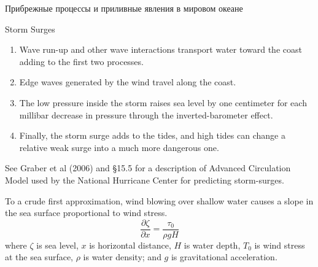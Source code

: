 \begin{chapter}{Прибрежные процессы и приливные явления в мировом океане}
\begin{section}{Storm Surges}
\begin{enumerate}
\item
Wave run-up and other wave interactions transport water toward the coast adding to the first two
processes.
%

\item
Edge waves generated by the wind travel along the coast.
%

\item
The low pressure inside the storm raises sea level by one centimeter
for each millibar decrease in pressure through the inverted-barometer
effect.
%

\item 
Finally, the storm surge adds to the tides, and high tides can change
a relative weak surge into a much more dangerous one.
%
\end{enumerate}
See Graber et al (2006) and \S 15.5 for a description of Advanced
Circulation Model used by the National Hurricane Center for predicting
storm-surges.
%

To a crude first approximation, wind blowing over shallow water causes
a slope in the sea surface proportional to wind stress.
\begin{equation}
\frac{\partial \zeta }{\partial x}= \frac{\tau _{0}}{\rho g H}
\end{equation}
where $\zeta $ is sea level, $x$ is horizontal distance, $H$ is water
depth, $T_{0}$ is wind stress at the sea surface, $\rho $ is water
density; and $g$ is gravitational acceleration.
%


\end{section}
\end{chapter}
